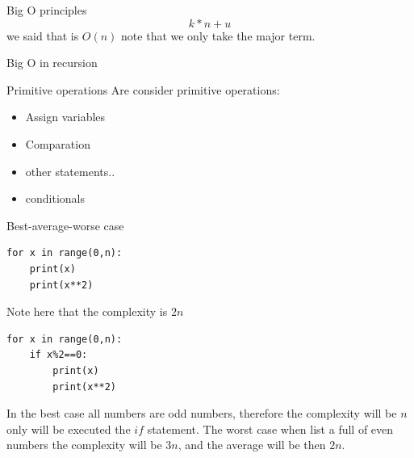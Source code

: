 \documentclass{beamer}
\begin{document}
\begin{frame}{Big O principles}
\begin{equation}
k*n + u
\end{equation}
we said that is $O(n)$
note that we only take the major term.
\end{frame}



\begin{frame}

\end{frame}


\begin{frame}{Big O in recursion}


\end{frame}

\begin{frame}{Primitive operations}
Are consider primitive operations:
\begin{itemize}
\item Assign variables
\item Comparation
\item other statements..
\item conditionals
\end{itemize}

\end{frame}


\begin{frame}[fragile]{Best-average-worse case}
\begin{lstlisting}
for x in range(0,n):
	print(x)
	print(x**2)
\end{lstlisting}
Note here that the complexity is $2n$
\begin{lstlisting}
for x in range(0,n):
	if x%2==0:
		print(x)
		print(x**2)
\end{lstlisting}
In the best case all numbers are odd numbers, therefore the complexity will be $n$ only will be executed the $if$ statement. The worst case when list a full of even numbers the complexity will be $3n$, and the average  will be then $2n$.
\end{frame}
\end{document}
